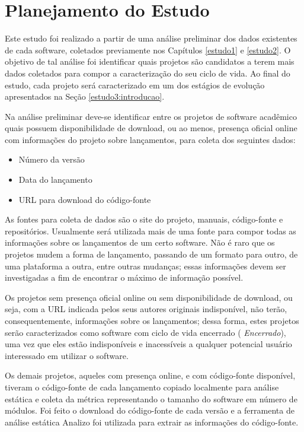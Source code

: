 
\section{Planejamento do Estudo} \label{estudo3:planejamento} %

Este estudo foi realizado a partir de uma análise preliminar dos dados existentes
de cada software, coletados previamente nos Capítulos \ref{estudo1} e
\ref{estudo2}. O objetivo de tal análise foi identificar quais projetos são candidatos a
terem mais dados coletados para compor a caracterização do seu ciclo de vida. 
Ao final do estudo, cada projeto será caracterizado em um dos estágios
de evolução apresentados na Seção \ref{estudo3:introducao}.

Na análise preliminar deve-se identificar entre os projetos de software
acadêmico quais possuem disponibilidade de download, ou ao menos, presença
oficial online com informações do projeto sobre lançamentos, para coleta
dos seguintes dados:

\begin{itemize}
  \item Número da versão
  \item Data do lançamento
  \item URL para download do código-fonte
\end{itemize}

As fontes para coleta de dados são o site do projeto, manuais, código-fonte e
repositórios. Usualmente será utilizada mais de uma fonte para compor todas as
informações sobre os lançamentos de um certo software. Não é raro que os
projetos mudem a forma de lançamento, passando de um formato para outro, de uma
plataforma a outra, entre outras mudanças; essas informações devem ser
investigadas a fim de encontrar o máximo de informação possível.

Os projetos sem presença oficial online ou sem disponibilidade de download, ou
seja, com a URL indicada pelos seus autores originais indisponível,
não terão, consequentemente, informações sobre os lançamentos; dessa forma, estes
projetos serão caracterizados como software com ciclo de vida encerrado ({\it
Encerrado}), uma vez que eles estão indisponíveis e inacessíveis a qualquer
potencial usuário interessado em utilizar o software.

Os demais projetos, aqueles com presença online, e com código-fonte disponível,
tiveram o código-fonte de cada lançamento copiado localmente para análise
estática e coleta da métrica representando o tamanho do software em número de
módulos. Foi feito o download do código-fonte de cada versão e a ferramenta de
análise estática Analizo foi utilizada para extrair as informações do código-fonte.

